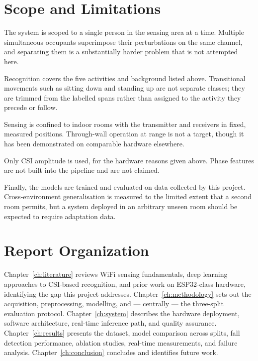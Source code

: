 \section{Scope and Limitations}

The system is scoped to a single person in the sensing area at a time.
Multiple simultaneous occupants superimpose their perturbations on the same
channel, and separating them is a substantially harder problem that is not
attempted here.

Recognition covers the five activities and background listed above.
Transitional movements such as sitting down and standing up are not separate
classes; they are trimmed from the labelled spans rather than assigned to the
activity they precede or follow.

Sensing is confined to indoor rooms with the transmitter and receivers in
fixed, measured positions. Through-wall operation at range is not a target,
though it has been demonstrated on comparable hardware elsewhere.

Only CSI amplitude is used, for the hardware reasons given above. Phase
features are not built into the pipeline and are not claimed.

Finally, the models are trained and evaluated on data collected by this
project. Cross-environment generalisation is measured to the limited extent
that a second room permits, but a system deployed in an arbitrary unseen
room should be expected to require adaptation data.

\section{Report Organization}

Chapter~\ref{ch:literature} reviews WiFi sensing fundamentals, deep learning
approaches to CSI-based recognition, and prior work on ESP32-class hardware,
identifying the gap this project addresses.
Chapter~\ref{ch:methodology} sets out the acquisition, preprocessing,
modelling, and --- centrally --- the three-split evaluation protocol.
Chapter~\ref{ch:system} describes the hardware deployment, software
architecture, real-time inference path, and quality assurance.
Chapter~\ref{ch:results} presents the dataset, model comparison across
splits, fall detection performance, ablation studies, real-time measurements,
and failure analysis.
Chapter~\ref{ch:conclusion} concludes and identifies future work.
